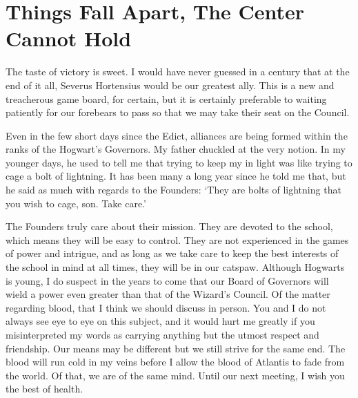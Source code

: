 \chapter{Things Fall Apart, The Center Cannot Hold}
\begin{writtenNote}{\small
{}
\SomeVSpace
The taste of victory is sweet. I would have never guessed in a century that at the end of it all, Severus Hortensius would be our greatest ally. This is a new and treacherous game board, for certain, but it is certainly preferable to waiting patiently for our forebears to pass so that we may take their seat on the Council.

Even in the few short days since the Edict, alliances are being formed within the ranks of the Hogwart’s Governors. My father chuckled at the very notion. In my younger days, he used to tell me that trying to keep my in light was like trying to cage a bolt of lightning. It has been many a long year since he told me that, but he said as much with regards to the Founders: ‘They are bolts of lightning that you wish to cage, son. Take care.’

The Founders truly care about their mission. They are devoted to the school, which means they will be easy to control. They are not experienced in the games of power and intrigue, and as long as we take care to keep the best interests of the school in mind at all times, they will be in our catspaw. Although Hogwarts is young, I do suspect in the years to come that our Board of Governors will wield a power even greater than that of the Wizard’s Council.
\SmallVSpace
Of the matter regarding blood, that I think we should discuss in person. You and I do not always see eye to eye on this subject, and it would hurt me greatly if you misinterpreted my words as carrying anything but the utmost respect and friendship. Our means may be different but we still strive for the same end. The blood will run cold in my veins before I allow the blood of Atlantis to fade from the world. Of that, we are of the same mind.
\SmallVSpace
Until our next meeting, I wish you the best of health.

}
\end{writtenNote} \normalsize
\simpleline


